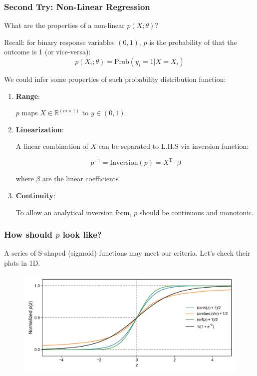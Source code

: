 \documentclass[10pt,aspectratio=169]{beamer}
\begin{document}
\begin{frame}
  \frametitle{Second Try: Non-Linear Regression}
  What are the properties of a non-linear $p(X; \theta)$?

  \vspace{1em}
  
  Recall: for binary response variables $(0, 1)$, $p$ is the probability of
  that the outcome is 1 (or vice-versa):
  \begin{equation*}
    p(X_{i}; \theta) = \mathrm{Prob}(y_{i}=1 | X=X_{i})
  \end{equation*}

  \vspace{1em}

  We could infer some properties of such probability distribution function:
  \begin{enumerate}
  \item \textbf{Range}:

    $p$ maps $X \in \mathbb{R}^{(m\times1)}$ to $y \in (0, 1)$.
    
  \item \textbf{Linearization}:

    A linear combination of $X$ can be separated to L.H.S via inversion function:

    \begin{equation*}
      p^{-1} = \mathrm{Inversion}(p) = X^{\mathrm{T}} \cdot \beta
    \end{equation*}

    where $\beta$ are the linear coefficients
  \item \textbf{Continuity}:

    To allow an analytical inversion form, $p$ should be continuous and monotonic.
    
  \end{enumerate}
  
\end{frame}

\begin{frame}
  \frametitle{How should $p$ look like?}

  A series of S-shaped (sigmoid) functions may meet our
  criteria. Let's check their plots in 1D.

  \vspace{-1em}
  \begin{figure}[t]
    \includegraphics[width=1.\textwidth]{scripts/sigmoid_funs.pdf}
  \end{figure}
  
\end{frame}
\end{document}
